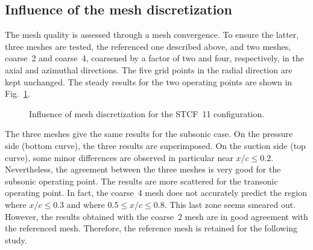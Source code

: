 \subsection{Influence of the mesh discretization}
\label{sub:stcf11_mesh_convergence}
The mesh quality is assessed through a mesh convergence.
To ensure the latter, three meshes are tested, the referenced one
described above, and two meshes, coarse~2 and coarse~4,
coarsened by a factor of two and four, respectively, in the axial and
azimuthal directions. The five grid points in the radial direction
are kept unchanged.
The steady results for the two operating points are shown 
in Fig.~\ref{fig:stcf11_mesh_convergence}.
\begin{figure}[htb!]
  \centering
  \caption{Influence of mesh discretization for the STCF~11 configuration.}
  \label{fig:stcf11_mesh_convergence}
\end{figure}
The three meshes give the same results for the subsonic case. On the
pressure side (bottom curve), the three results are superimposed. On the suction side
(top curve),
some minor differences are observed in particular near
$x / c \leq 0.2$. Nevertheless, the agreement
between the three meshes is very good for the subsonic operating point.
The results are more scattered for the transonic operating point. In fact,
the coarse~4 mesh does not accurately predict the region where $x / c \leq 0.3$
and where $0.5 \leq x / c \leq 0.8$. This last zone seems smeared out. 
However, the results
obtained with the coarse~2 mesh are in good agreement with the referenced mesh.
Therefore, the reference mesh is retained for the following study.

